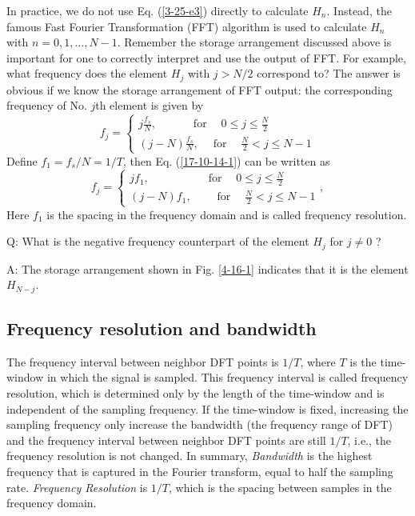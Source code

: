 \documentclass{article}
\newcommand{\tmem}[1]{{\em #1\/}}
\newcommand{\tmop}[1]{\ensuremath{\operatorname{#1}}}
\begin{document}
In practice, we do not use Eq. (\ref{3-25-e3}) directly to calculate $H_n$.
Instead, the famous Fast Fourier Transformation (FFT) algorithm is used to
calculate $H_n$ with $n = 0, 1, \ldots, N - 1$. Remember the storage
arrangement discussed above is important for one to correctly interpret and
use the output of FFT. For example, what frequency does the element $H_j$ with
$j > N / 2$ correspond to? The answer is obvious if we know the storage
arrangement of FFT output: the corresponding frequency of No. $j$th element is
given by
\begin{equation}
  \label{17-10-14-1} f_j = \left\{ \begin{array}{l}
    j \frac{f_s}{N}, \hspace{3em} \tmop{for} \quad 0 \leqslant j \leqslant
    \frac{N}{2}\\
    (j - N) \frac{f_s}{N}, \quad \tmop{for} \quad  \frac{N}{2} < j \leqslant N
    - 1
  \end{array} \right.
\end{equation}
Define $f_1 = f_s / N = 1 / T$, then Eq. (\ref{17-10-14-1}) can be written as
\begin{equation}
  f_j = \left\{ \begin{array}{l}
    j f_1, \hspace{5em} \tmop{for} \quad 0 \leqslant j \leqslant \frac{N}{2}\\
    (j - N) f_1, \qquad \tmop{for} \quad  \frac{N}{2} < j \leqslant N - 1
  \end{array} \right.,
\end{equation}
Here $f_1$ is the spacing in the frequency domain and is called frequency
resolution.

Q: What is the negative frequency counterpart of the element $H_j$ for $j \neq
0$ ?

A: The storage arrangement shown in Fig. \ref{4-16-1} indicates that it is the
element $H_{N - j}$.

\subsection{Frequency resolution and bandwidth}

The frequency interval between neighbor DFT points is $1 / T$, where $T$ is
the time-window in which the signal is sampled. This frequency interval is
called frequency resolution, which is determined only by the length of the
time-window and is independent of the sampling frequency. If the time-window
is fixed, increasing the sampling frequency only increase the bandwidth (the
frequency range of DFT) and the frequency interval between neighbor DFT points
are still $1 / T$, i.e., the frequency resolution is not changed. In summary,
{\tmem{Bandwidth}} is the highest frequency that is captured in the Fourier
transform, equal to half the sampling rate. {\tmem{Frequency Resolution}} is
$1 / T$, which is the spacing between samples in the frequency domain.
\end{document}
